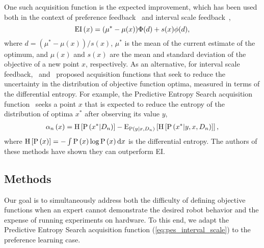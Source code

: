 One such acquisition function is the expected improvement, which has been used
both in the context of preference feedback~\citep{eric2008active} and interval
scale feedback~\citep{jones1998efficient},
\begin{equation}
    \func{EI}{x} = (\mu^* - \mu(x))\Phi(d) + s(x)\phi(d),
    \label{eq:expected_improvement}
\end{equation}
where $d = (\mu^* - \mu(x))/s(x)$, $\mu^*$ is the mean of the current estimate
of the optimum, and $\mu(x)$ and $s(x)$ are the mean and standard deviation of
the objective of a new point $x$, respectively. As an alternative, for interval
scale feedback,~\citep{hennig2012entropy} and~\citep{hernandez2014predictive}
proposed acquisition functions that seek to reduce the uncertainty in the
distribution of objective function optima, measured in terms of the differential
entropy. For example, the Predictive Entropy Search acquisition
function~\citep{hernandez2014predictive} seeks a point $x$ that is expected to
reduce the entropy of the distribution of optima $x^*$ after observing its value
$y$,
\begin{align}
    \alpha_n \left(x \right) = \funcsb{H}{\prob{x^*|D_n}} 
        - \funcsb{E}[\prob{y|x, D_n}]{\funcsb{H}{\prob{x^*|y, x, D_n}}},
    \label{eq:pes_interval_scale}
\end{align}
where $\funcsb{H}{\prob{x}} = - \int \prob{x} \log \prob{x} \tn{d} x$
is the differential entropy. The authors of these methods have shown they can
outperform EI\@. 

\subsection{Methods}
Our goal is to simultaneously address both the difficulty of defining objective
functions when an expert cannot demonstrate the desired robot behavior and the
expense of running experiments on hardware. To this end, we adapt the Predictive
Entropy Search acquisition function (\cref{eq:pes_interval_scale}) to the
preference learning case.

